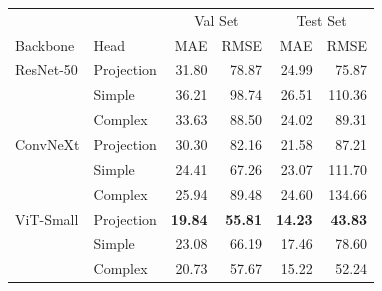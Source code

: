 \begin{tabular}{llrrrr}
\toprule
 & & \multicolumn{2}{c}{Val Set} & \multicolumn{2}{c}{Test Set} \\
 Backbone & Head & MAE & RMSE & MAE & RMSE \\
 \midrule

ResNet-50 & Projection & 31.80 & 78.87 & 24.99 & 75.87 \\
& Simple & 36.21 & 98.74 & 26.51 & 110.36\\
& Complex & 33.63 & 88.50 & 24.02 & 89.31
\\


ConvNeXt & Projection & 30.30 & 82.16 & 21.58 & 87.21 \\
 & Simple & 24.41 & 67.26 & 23.07 & 111.70 \\
 & Complex &  25.94 & 89.48 & 24.60 & 134.66 \\
ViT-Small & Projection & \textbf{19.84}  & \textbf{55.81} & \textbf{14.23}  & \textbf{43.83} \\

 & Simple & 23.08 & 66.19 & 17.46 & 78.60 \\
 &  Complex & 20.73 & 57.67 & 15.22 & 52.24 \\
\bottomrule
\end{tabular}
